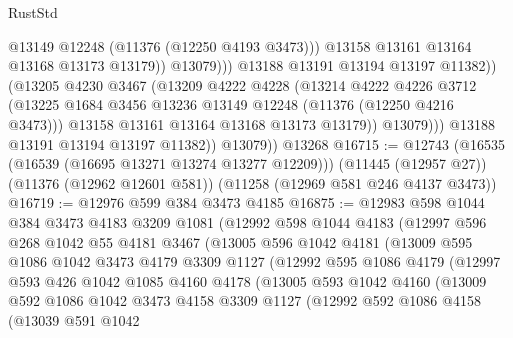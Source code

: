 \begin{lexlean}{RustStd}
\begin{coremodule}
{\begin{coremodule}
{{{{{{{{{{{{{{{{{{{{{{{{{{{{{{{{{{{{{{{{{{{{{{{{{{{{{{{{{{{{{{{{{{{{{{{{{{{{{{{{{{{{{                                @13149
                                @12248
                                (@11376 (@12250 @4193 @3473)))
                              @13158
                              @13161
                              @13164
                              @13168
                              @13173
                              @13179))
                          @13079)))
                    @13188
                    @13191
                    @13194
                    @13197
                    @11382))
                (@13205
                  @4230
                  @3467
                  (@13209
                    @4222
                    @4228
                    (@13214
                      @4222
                      @4226
                      @3712
                      (@13225 @1684 @3456 @13236 @13149 @12248 (@11376 (@12250 @4216 @3473)))
                      @13158
                      @13161
                      @13164
                      @13168
                      @13173
                      @13179))
                  @13079)))
            @13188
            @13191
            @13194
            @13197
            @11382))
        @13079))
    @13268
@16715 := @12743
    (@16535 (@16539 (@16695 @13271 @13274 @13277 @12209)))
    (@11445 (@12957 @27))
    (@11376 (@12962 @12601 @581))
    (@11258 (@12969 @581 @246 @4137 @3473))
@16719 := @12976 @599 @384 @3473 @4185
@16875 := @12983
    @598
    @1044
    @384
    @3473
    @4183
    @3209
    @1081
    (@12992
      @598
      @1044
      @4183
      (@12997
        @596
        @268
        @1042
        @55
        @4181
        @3467
        (@13005
          @596
          @1042
          @4181
          (@13009
            @595
            @1086
            @1042
            @3473
            @4179
            @3309
            @1127
            (@12992
              @595
              @1086
              @4179
              (@12997
                @593
                @426
                @1042
                @1085
                @4160
                @4178
                (@13005
                  @593
                  @1042
                  @4160
                  (@13009
                    @592
                    @1086
                    @1042
                    @3473
                    @4158
                    @3309
                    @1127
                    (@12992
                      @592
                      @1086
                      @4158
                      (@13039
                        @591
                        @1042
}}}}}}}}}}}}}}}}}}}}}}}}}}}}}}}}}}}}}}}}}}}}}}}}}}}}}}}}}}}}}}}}}}}}}}}}}}}}}}}}}}}}}
\end{coremodule}}
\end{coremodule}
\end{lexlean}
